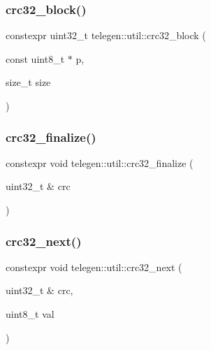 \mbox{\label{namespacetelegen_1_1util_a8a5ff5e52e1ddc9e7872d27ecf1f12f7}} 
\subsubsection{\texorpdfstring{crc32\+\_\+block()}{crc32\_block()}}
{\footnotesize\ttfamily constexpr uint32\+\_\+t telegen\+::util\+::crc32\+\_\+block (\begin{DoxyParamCaption}\item[{const uint8\+\_\+t $\ast$}]{p,  }\item[{size\+\_\+t}]{size }\end{DoxyParamCaption})}

\mbox{\label{namespacetelegen_1_1util_a8955104562232d81e72279ab7a4787fe}} 
\subsubsection{\texorpdfstring{crc32\+\_\+finalize()}{crc32\_finalize()}}
{\footnotesize\ttfamily constexpr void telegen\+::util\+::crc32\+\_\+finalize (\begin{DoxyParamCaption}\item[{uint32\+\_\+t \&}]{crc }\end{DoxyParamCaption})}

\mbox{\label{namespacetelegen_1_1util_a6724e747bbf9b75d4c08cf9a910b5d0f}} 
\subsubsection{\texorpdfstring{crc32\+\_\+next()}{crc32\_next()}}
{\footnotesize\ttfamily constexpr void telegen\+::util\+::crc32\+\_\+next (\begin{DoxyParamCaption}\item[{uint32\+\_\+t \&}]{crc,  }\item[{uint8\+\_\+t}]{val }\end{DoxyParamCaption})}

